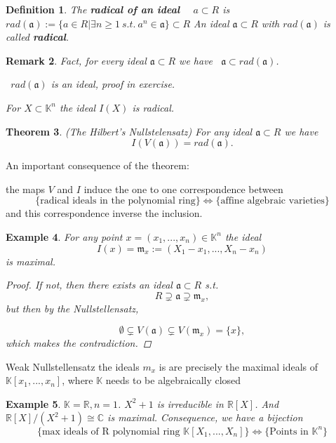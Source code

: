 \documentclass[11pt]{article}
\newtheorem{thm}{Theorem}[section]
\newtheorem{dfn}[thm]{Definition}
\newtheorem{rmk}[thm]{Remark}
\newtheorem{ex}[thm]{Example}
\newcommand{\reals}{\mathbb R}
\newcommand{\cplx}{\mathbb C}
\newcommand{\bbk}{\mathbb K}
\newcommand{\sca}{{\mathfrak a}}
\newcommand{\scm}{{\mathfrak m}}
\begin{document}
\begin{dfn}
The \textbf{radical of an ideal}   $a\subset R$ is 
 $rad(\sca):=\{a\in R| \exists n\geq1\  s.t.\  a^n \in \sca\} \subset R$
An ideal $\sca \subset R$ with $rad(\sca)$ is  called \textbf{radical}.
\end{dfn}

\begin{rmk}
Fact, 
for every ideal $\sca \subset R$ we have  $\sca\subset rad(\sca)$.

 $rad(\sca)$ is an ideal, proof in exercise.

For $X\subset \bbk^n$ the ideal $I(X)$ is radical. 

\end{rmk}

\begin{thm}
(The Hilbert's Nullstelensatz)
For any ideal $\sca \subset R $ we have
$$I(V(\sca))=rad(\sca).$$
\end{thm}

An important consequence of the theorem:

the maps $V$ and $I$ induce the one to one correspondence between
$$
\{\text{radical ideals in the polynomial ring}\}\Longleftrightarrow                   \{\text{affine algebraic varieties}\}
$$
and this correspondence inverse the inclusion.

\begin{ex}
For any point $x=(x_1,...,x_n) \in \bbk^n$ the ideal 
$$
I({x})=\scm_x:=(X_1-x_1,...,X_n-x_n)
$$
is maximal.
\begin{proof}

 If not, then there exists an ideal $\sca \subset R$
s.t. 
\begin{equation*}
R\supsetneq \sca \supsetneq \scm_x,
\end{equation*}
but then by the Nullstellensatz,

\begin{equation*}
\emptyset\subsetneq V(\sca) \subsetneq V(\scm_x)=\{x\},
\end{equation*}
which makes the contradiction.
\end{proof}
\end{ex}

Weak Nullstellensatz the ideals $m_x$ is are precisely the maximal ideals of $\bbk[x_1,...,x_n]$, where $\bbk$ needs to be algebraically closed
\begin{ex}
$\bbk=\reals, n=1$.
$X^2+1$ is irreducible in $\reals[X]$.
And $\reals[X]/(X^2+1) \cong \cplx$ is maximal.
Consequence, we have a bijection
$$
\{\text{max ideals of R polynomial ring }\bbk[X_1,...,X_n]\}
\Longleftrightarrow\{\text{Points in } \bbk^n\}
$$
\end{ex}
\end{document}
